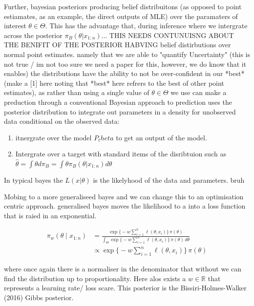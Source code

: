 \documentclass[11pt,a4paper]{article}
\begin{document}
Further, bayesian posteriors producing belief distribuitons (as opposed to point estiamates, as an example, the direct outputs of MLE) over the paramaters of interest $\theta \in \Theta$.
This has the advantage that, during inference where we intergrate across the posterior $\pi_B(\theta | x_{1:n})$...
THIS NEEDS CONTUNUISNG ABOUT THE BENIFIT OF THE POSTERIOR HABVING belief distirbutions over normal point estimates. namely that we are able to "quantify Uncertainty" (this is not true / im not too sure we need a paper for this, however, we do know that it enables) the distributions have the ability to not be over-confident in our *best*(make a [1] here noting that *best* here refrers to the best of other point estimates), as rather than using a single value of $\theta \in \Theta$ we use can make a preduction through a conventional Bayesian approach to prediction uses the posterior distribution to integrate out parameters in a density for unobserved data conditional on the observed data:
\begin{enumerate}
    \item itnergrate over the model $P_theta$ to get an output of the model.
    \item Intergrate over a target with standard items of the disribtuion such as $\hat{\theta} = \int \theta d\pi_B = \int \theta \pi_B(\theta | x_{1:n} ) d\theta$
\end{enumerate}




In typical bayes the $L(x | \theta)$ is the likelyhood of the data
and
parameters.
bruh

Mobing to a more generaliseed bayes and we can change this to an optimisation centric approach. generalised bayes moves the likelihood to a into a loss function that is raied in an exponential.

\begin{align*}
    \pi_{w}(\theta \mid x_{1:n}) & = \frac{\exp\big\{-w\sum_{i=1}^{n}\ell(\theta, x_i)\big\}\,\pi(\theta)}{\displaystyle\int_{\Theta}\exp\big\{-w\sum_{i=1}^{n}\ell(\theta, x_i)\big\}\,\pi(\theta)\,d\theta} \\
                                 & \propto \exp\big\{-w\sum_{i=1}^{n}\ell(\theta, x_i)\big\}\,\pi(\theta)
\end{align*}


where once again there is a normaliser in the denominator that without we can find the distribution up to proportionality. Here alos exists a $w\in\mathbb{R}$ that represents a learning rate/ loss scare. This posterior is the Bissiri-Holmes-Walker (2016) Gibbs posterior.
\end{document}

